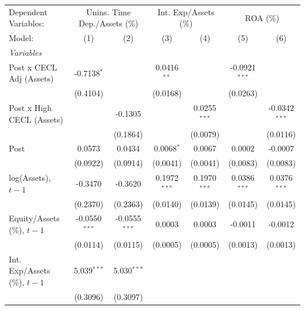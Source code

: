 
\begingroup
\centering
\begin{tabular}{lcccccc}
   \tabularnewline \midrule \midrule
   Dependent Variables: & \multicolumn{2}{c}{Unins. Time Dep./Assets (\%)} & \multicolumn{2}{c}{Int. Exp/Assets (\%)} & \multicolumn{2}{c}{ROA (\%)}\\
   Model:                         & (1)             & (2)             & (3)            & (4)            & (5)             & (6)\\  
   \midrule
   \emph{Variables}\\
   Post x CECL Adj (Assets)       & -0.7138$^{*}$   &                 & 0.0416$^{**}$  &                & -0.0921$^{***}$ &   \\   
                                  & (0.4104)        &                 & (0.0168)       &                & (0.0263)        &   \\   
   Post x High CECL (Assets)      &                 & -0.1305         &                & 0.0255$^{***}$ &                 & -0.0342$^{***}$\\   
                                  &                 & (0.1864)        &                & (0.0079)       &                 & (0.0116)\\   
   Post                           & 0.0573          & 0.0434          & 0.0068$^{*}$   & 0.0067         & 0.0002          & -0.0007\\   
                                  & (0.0922)        & (0.0914)        & (0.0041)       & (0.0041)       & (0.0083)        & (0.0083)\\   
   log(Assets), $t{-}1$           & -0.3470         & -0.3620         & 0.1972$^{***}$ & 0.1970$^{***}$ & 0.0386$^{***}$  & 0.0376$^{***}$\\   
                                  & (0.2370)        & (0.2363)        & (0.0140)       & (0.0139)       & (0.0145)        & (0.0145)\\   
   Equity/Assets (\%), $t{-}1$    & -0.0550$^{***}$ & -0.0555$^{***}$ & 0.0003         & 0.0003         & -0.0011         & -0.0012\\   
                                  & (0.0114)        & (0.0115)        & (0.0005)       & (0.0005)       & (0.0013)        & (0.0013)\\   
   Int. Exp/Assets (\%), $t{-}1$  & 5.039$^{***}$   & 5.030$^{***}$   &                &                &                 &   \\   
                                  & (0.3096)        & (0.3097)        &                &                &                 &   \\   

\end{tabular}
